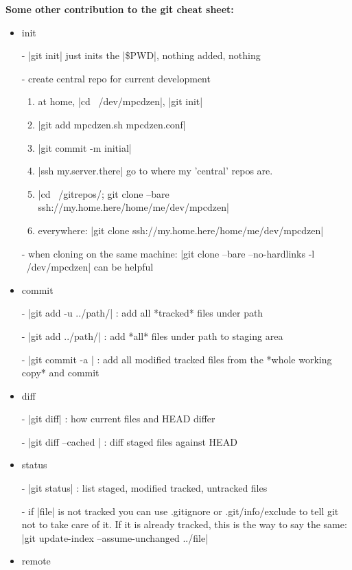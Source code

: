 \noindent
\textbf{Some other contribution to the git cheat sheet:}
\begin{itemize}


\item{init}

- |git init|  just inits the |\$PWD|, nothing added, nothing

- create central repo for current development\begin{enumerate}

	\item at home, |cd ~/dev/mpcdzen|, |git init|
	\item |git add mpcdzen.sh mpcdzen.conf|
	\item |git commit -m initial|
	\item |ssh my.server.there| go to where my 'central' repos are.
	\item |cd ~/gitrepos/; git clone --bare  ssh://my.home.here/home/me/dev/mpcdzen|
	\item everywhere: |git clone ssh://my.home.here/home/me/dev/mpcdzen| \end{enumerate}

- when cloning on the same machine:
  |git clone --bare --no-hardlinks -l ~/dev/mpcdzen|  can be helpful



\item{commit}

- |git add -u ../path/| : add all *tracked* files under path

- |git add ../path/| : add *all* files under path to staging area

- |git commit -a | : add all modified tracked files from the *whole
  working copy* and commit


\item{diff}

- |git diff| : how current files and HEAD differ

- |git diff --cached | : diff staged files against HEAD


\item{status}

- |git status| : list staged, modified tracked, untracked files

- if |file| is not tracked you can use .gitignore or .git/info/exclude
  to tell git not to take care of it. If it is already tracked, this is
  the way to say the same: |git update-index --assume-unchanged ../file|

\item{remote}


\end{itemize}
